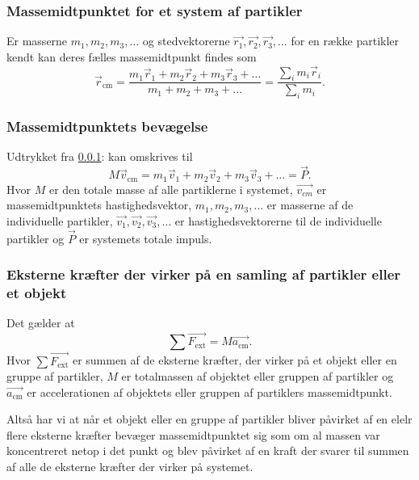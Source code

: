 \subsubsection{Massemidtpunktet for et system af partikler} \label{sec:cm}
Er masserne $m_1, m_2, m_3, \ldots$ og stedvektorerne $\Vec{r_1}, \Vec{r_2}, \Vec{r_3}, \ldots $ for en række partikler kendt kan deres fælles massemidtpunkt findes som
\[ 
\Vec{r}_{\text{cm}} = \frac{m_1 \Vec{r}_1 + m_2 \Vec{r}_2 + m_3 \Vec{r}_3 + \ldots }{m_1 + m_2 + m_3 +\ldots} = \frac{\sum_i m_i \Vec{r}_{i}}{\sum_i m_i}
.\]


\subsubsection{Massemidtpunktets bevægelse} \label{afs:cmbev}
Udtrykket fra \ref{sec:cm}:  kan omskrives til
\[ 
M \Vec{v}_{\text{cm}} = m_1 \Vec{v}_1 + m_2 \Vec{v}_2 + m_3 \Vec{v}_3 + \ldots = \Vec{P}
.\]
Hvor $M$ er den totale masse af alle partiklerne i systemet, $\Vec{v_{cm}}$ er massemidtpunktets hastighedsvektor, $m_1, m_2, m_3,\ldots$ er masserne af de individuelle partikler, $\Vec{v_1}, \Vec{v_2}, \Vec{v_3}, \ldots $ er hastighedsvektorerne til de individuelle partikler og $\Vec{P}$ er systemets totale impuls.


\subsubsection{Eksterne kræfter der virker på en samling af partikler eller et objekt} \label{afs:new2eks}
Det gælder at
\[ 
\sum \Vec{F_{\text{ext}}} = M \Vec{a_{\text{cm}}}
.\]
Hvor $\sum \Vec{F_{\text{ext}}}$ er summen af de eksterne kræfter, der virker på et objekt eller en gruppe af partikler, $M$ er totalmassen af objektet eller gruppen af partikler og $\Vec{a_{\text{cm}}}$ er accelerationen af objektets eller gruppen af partiklers massemidtpunkt.

Altså har vi at når et objekt eller en gruppe af partikler bliver påvirket af en elelr flere eksterne kræfter bevæger massemidtpunktet sig som om al massen var koncentreret netop i det punkt og blev påvirket af en kraft der svarer til summen af alle de eksterne kræfter der virker på systemet.
